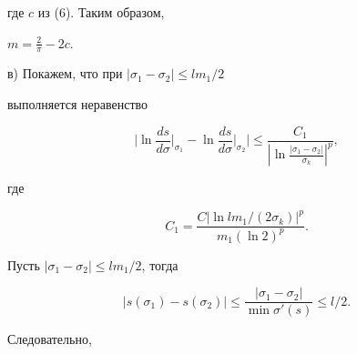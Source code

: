 где $c$ из (6). Таким образом,


$m = \frac{2}{\pi} - 2 c$.





в) Покажем, что при $|\sigma_1 - \sigma_2| \leq lm_1/2$


выполняется неравенство


$$


\bigg|\ln \frac{ds}{d\sigma}\bigg|_{\sigma_1}


- \ln \frac{ds}{d\sigma}\bigg|_{\sigma_2}\bigg| \leq \frac{C_1}{|\ln


\frac{|\sigma_1 - \sigma_2|}{\sigma_k}|^p},


$$


где


\begin{equation}


C_1 =\frac{C|\ln lm_1/(2\sigma_k)|^p}{m_1 (\ln 2)^p}.


\end{equation}





Пусть $|\sigma_1 - \sigma_2| \leq l m_1/2$, тогда


$$


|s(\sigma_1) - s(\sigma_2)| \leq \frac{|\sigma_1 - \sigma_2|}{\min


\sigma'(s)} \leq l/2.


$$


Следовательно,


